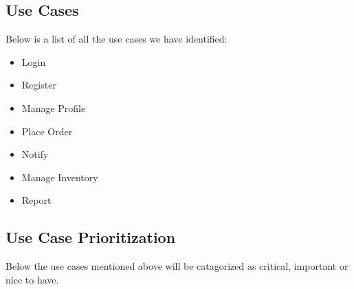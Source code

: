 \documentclass[12pt]{article}
\begin{document}
\subsection{Use Cases }
Below is a list of all the use cases we have identified:

\begin{itemize}

\item  Login
\item Register
\item Manage Profile
\item Place Order
\item Notify
\item Manage Inventory
\item Report

\end{itemize}


\subsection{Use Case Prioritization}
Below the use cases mentioned above will be catagorized as critical, important or nice to have.
\end{document}
